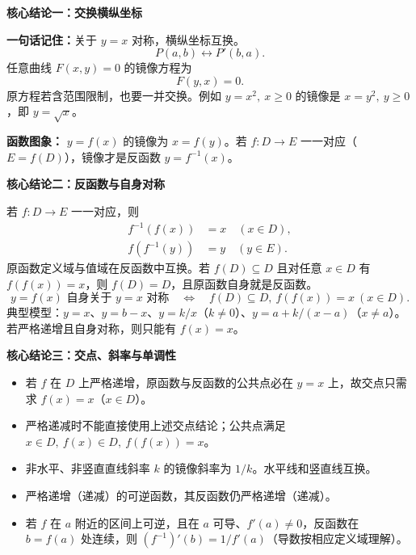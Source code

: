 \begin{statementbox}
\textbf{\textcolor{CStatement}{核心结论一：交换横纵坐标}}


\textbf{一句话记住：}关于 $y=x$ 对称，横纵坐标互换。
\[
\boxed{P(a,b)\longleftrightarrow P'(b,a)}.
\]
任意曲线 $F(x,y)=0$ 的镜像方程为
\[
\boxed{F(y,x)=0}.
\]
原方程若含范围限制，也要一并交换。例如 $y=x^2,\ x\ge0$ 的镜像是 $x=y^2,\ y\ge0$，即 $y=\sqrt{x}$。

\textbf{函数图象：} $y=f(x)$ 的镜像为 $x=f(y)$。若 $f:D\to E$ 一一对应（$E=f(D)$），镜像才是反函数 $y=f^{-1}(x)$。
\end{statementbox}
\clearpage
\begin{statementbox}
\textbf{\textcolor{CStatement}{核心结论二：反函数与自身对称}}


若 $f:D\to E$ 一一对应，则
\[
\begin{aligned} f^{-1}(f(x))&=x\quad(x\in D),\\ f(f^{-1}(y))&=y\quad(y\in E).\end{aligned}
\]
原函数定义域与值域在反函数中互换。若 $f(D)\subseteq D$ 且对任意 $x\in D$ 有 $f(f(x))=x$，则 $f(D)=D$，且原函数自身就是反函数。
\[
\boxed{y=f(x)\text{ 自身关于 }y=x\text{ 对称}}
\quad\Longleftrightarrow\quad
\boxed{f(D)\subseteq D,\ f(f(x))=x\ (x\in D)}.
\]
典型模型：$y=x$、$y=b-x$、$y=k/x$（$k\ne0$）、$y=a+k/(x-a)$（$x\ne a$）。若严格递增且自身对称，则只能有 $f(x)=x$。
\end{statementbox}
\clearpage
\begin{statementbox}
\textbf{\textcolor{CStatement}{核心结论三：交点、斜率与单调性}}


\begin{itemize}[leftmargin=*,itemsep=.4em]
\item 若 $f$ 在 $D$ 上严格递增，原函数与反函数的公共点必在 $y=x$ 上，故交点只需求 $f(x)=x$（$x\in D$）。
\item 严格递减时不能直接使用上述交点结论；公共点满足 $x\in D,\ f(x)\in D,\ f(f(x))=x$。
\item 非水平、非竖直直线斜率 $k$ 的镜像斜率为 $1/k$。水平线和竖直线互换。
\item 严格递增（递减）的可逆函数，其反函数仍严格递增（递减）。
\item 若 $f$ 在 $a$ 附近的区间上可逆，且在 $a$ 可导、$f'(a)\ne0$，反函数在 $b=f(a)$ 处连续，则
$\displaystyle (f^{-1})'(b)=1/f'(a)$（导数按相应定义域理解）。
\end{itemize}
\end{statementbox}
